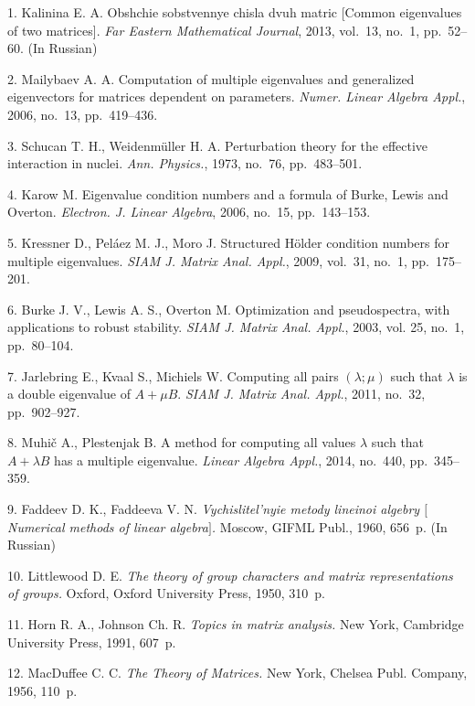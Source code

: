 

{\footnotesize

\vskip 3mm


\vskip 2mm

1. Kalinina E. A. Obshchie sobstvennye chisla dvuh matric [Common
eigenvalues of two matrices]. \emph{Far Eastern Mathematical
Journal}, 2013, vol.~13, no.~1, pp.~52--60. (In Russian)

2.  Mailybaev A. A. Computation of multiple eigenvalues and
generalized eigenvectors for matrices dependent on parameters.
\emph{Numer. Linear Algebra Appl.}, 2006, no.~13, pp.~419--436.

3.  Schucan T. H., Weidenm\"{u}ller H. A. Perturbation theory for
the effective interaction in nuclei. \emph{Ann. Physics.}, 1973,
no.~76, pp.~483--501.

4. Karow M. Eigenvalue condition numbers and a formula of Burke,
Lewis and Overton. \emph{Electron. J. Linear Algebra}, 2006,
no.~15, pp.~143--153.

5. Kressner D., Pel\'{a}ez M. J., Moro J. Structured H\"{o}lder
condition numbers for multiple eigenvalues. \emph{SIAM J. Matrix
Anal. Appl.}, 2009, vol.~31, no.~1, pp.~175--201.

6. Burke J. V., Lewis A. S., Overton M. Optimization and
pseudospectra, with applications to robust stability. \emph{SIAM
J. Matrix Anal. Appl.}, 2003, vol. 25, no.~1, pp.~80--104.

7. Jarlebring E., Kvaal S., Michiels W. Computing all pairs
$(\lambda;\mu)$ such that $\lambda$ is a double eigenvalue of
$A+\mu B$. \emph{SIAM J. Matrix Anal. Appl.}, 2011, no.~32,
pp.~902--927.

8. Muhi\v{c} A., Plestenjak B. A method for computing all values
$\lambda$ such that $A+\lambda B$ has a multiple eigenvalue.
\emph{Linear Algebra Appl.}, 2014, no.~440, pp.~345--359.

9. Faddeev D. K., Faddeeva V. N. \emph{Vychislitel'nyie metody
lineinoi algebry $[$Numerical methods of linear algebra$]$.}
Moscow, GIFML Publ., 1960, 656~p. (In Russian)

10. Littlewood D. E. \emph{The theory of group characters and
matrix representations of groups.} Oxford, Oxford University
Press, 1950, 310~p.

11. Horn R. A., Johnson Ch. R. \emph{Topics in matrix analysis.}
New York, Cambridge University Press, 1991, 607~p.

12. MacDuffee C. C. \emph{The Theory of Matrices.} New York,
Chelsea Publ. Company, 1956, 110~p.

}
